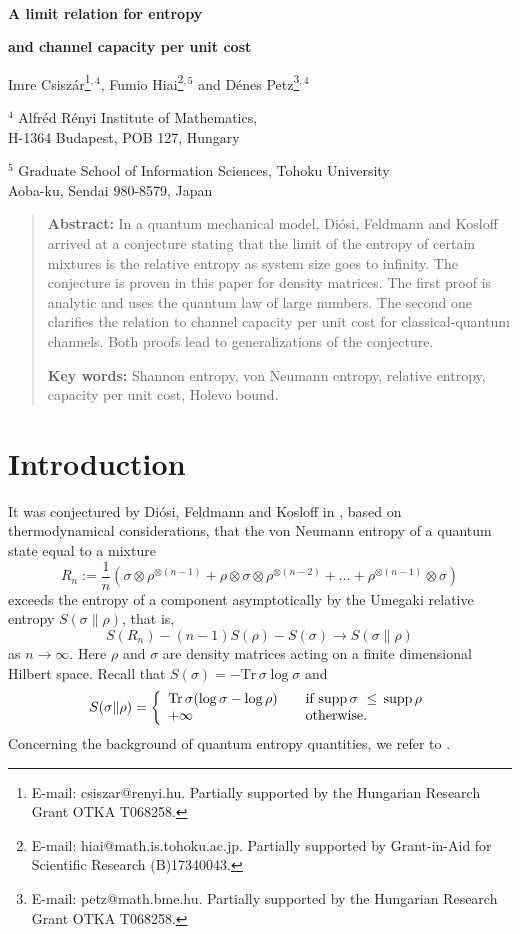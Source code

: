\documentclass[12pt,a4paper]{article}
\def\Tr{{\mathrm{Tr}}}
\def\supp{\mathrm{supp}\,}
\def\ot{\otimes}
\begin{document}
\ \vskip 1cm \centerline{\LARGE {\bf A limit relation for  entropy}} \bigskip
\centerline{\LARGE {\bf and channel capacity per unit cost}}
\bigskip
\bigskip
\bigskip
\centerline{\large Imre Csisz\'ar\footnote{E-mail: csiszar@renyi.hu.
Partially supported by the Hungarian Research Grant OTKA T068258.}$^{,4}$,
Fumio Hiai\footnote{E-mail: hiai@math.is.tohoku.ac.jp. Partially supported 
by Grant-in-Aid for Scientific Research (B)17340043.}$^{,5}$ and
D\'enes Petz\footnote{E-mail: petz@math.bme.hu.
Partially supported by the Hungarian Research Grant OTKA T068258.}$^{,4}$
}
\bigskip
\begin{center}
$^4$ Alfr\'ed R\'enyi Institute of Mathematics, \\H-1364 Budapest,
POB 127, Hungary
\end{center}
\begin{center}
$^5$ Graduate School of Information Sciences, Tohoku University \\
Aoba-ku, Sendai 980-8579, Japan
\end{center}
\bigskip
\bigskip\bigskip

\begin{quote}
{\bf Abstract:} In a quantum mechanical model, Di\'osi, Feldmann and Kosloff arrived
at a conjecture stating that the limit of the entropy of certain mixtures is the
relative entropy as system size goes to infinity. The conjecture is proven in this
paper for density matrices. The first proof is analytic and uses the quantum law of
large numbers. The second one clarifies the relation to channel capacity
per  unit cost for classical-quantum channels. Both proofs lead to generalizations 
of the conjecture.

{\bf Key words:} Shannon entropy, von Neumann entropy, relative entropy,
capacity per unit cost, Holevo bound.
\end{quote}
\bigskip
\bigskip
\section{Introduction}
It was conjectured by Di\'osi, Feldmann and Kosloff in \cite{diosi},
based on thermodynamical considerations, that the von Neumann entropy
of a quantum state equal to a mixture
$$
R_n:=\frac{1}{n}\left(\sigma\ot \rho^{\ot (n-1)}
+\rho \ot \sigma \ot \rho^{\ot (n-2)}+  \dots
+ \rho^{\ot (n-1)} \ot \sigma\right) 
$$
exceeds the entropy of a component asymptotically by the Umegaki relative
entropy $S(\sigma\|\rho)$, that is,
\begin{equation}\label{conj}
S(R_n)- (n-1)S(\rho)-S(\sigma)\to S(\sigma\|\rho)
\end{equation} as $n \to \infty$. Here $\rho$ and $\sigma$ are density 
matrices acting on a finite dimensional Hilbert space. Recall that
$S(\sigma)=-\Tr\, \sigma \log \sigma$ and
$$
S(\sigma \| \rho)=\left\{ \begin{array}{ll}
\Tr\, \sigma(\log \sigma -\log \rho) \quad & \hbox{if } \supp
\sigma\,\,\le \,\supp \rho\\
+\infty &\hbox{otherwise.} \end{array} \right. $$
Concerning the background of quantum entropy quantities, we refer to \cite{OP, pd}.
\end{document}
